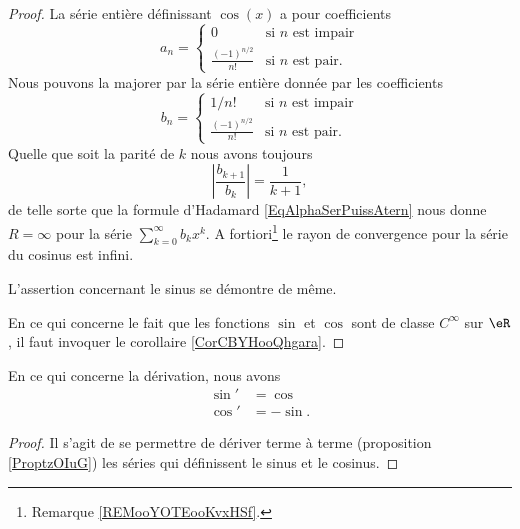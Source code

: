 \begin{proof}
    La série entière définissant \( \cos(x)\) a pour coefficients
    \begin{equation}
        a_n=\begin{cases}
            0    &   \text{si } n\text{ est impair}\\
            \frac{ (-1)^{n/2} }{ n! }    &   \text{si } n\text{ est pair}.
        \end{cases}
    \end{equation}
    Nous pouvons la majorer par la série entière donnée par les coefficients
    \begin{equation}
        b_n=\begin{cases}
            1/n!    &   \text{si } n\text{ est impair}\\
            \frac{ (-1)^{n/2} }{ n! }    &   \text{si } n\text{ est pair}.
        \end{cases}
    \end{equation}
    Quelle que soit la parité de \( k\) nous avons toujours
    \begin{equation}
        | \frac{ b_{k+1} }{ b_k } |=\frac{1}{ k+1 },
    \end{equation}
    de telle sorte que la formule d'Hadamard \eqref{EqAlphaSerPuissAtern} nous donne \( R=\infty\) pour la série \( \sum_{k=0}^{\infty}b_kx^k\). A fortiori\footnote{Remarque \ref{REMooYOTEooKvxHSf}.} le rayon de convergence pour la série du cosinus est infini.

    L'assertion concernant le sinus se démontre de même.

    En ce qui concerne le fait que les fonctions \( \sin\) et \( \cos\) sont de classe \(  C^{\infty}\) sur \( \eR\), il faut invoquer le corollaire \ref{CorCBYHooQhgara}.
\end{proof}

\begin{lemma}
    En ce qui concerne la dérivation, nous avons
    \begin{subequations}
        \begin{align}
            \sin'&=\cos\\
            \cos'&=-\sin.
        \end{align}
    \end{subequations}
\end{lemma}

\begin{proof}
    Il s'agit de se permettre de dériver terme à terme (proposition \ref{ProptzOIuG}) les séries qui définissent le sinus et le cosinus.
\end{proof}

